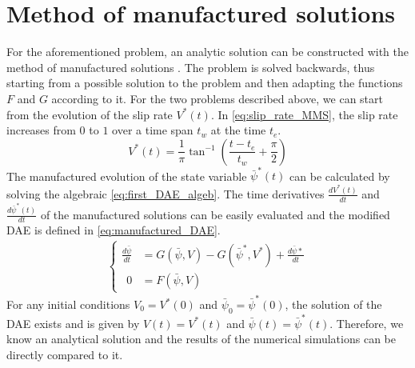 \section{Method of manufactured solutions}
For the aforementioned problem, an analytic solution can be constructed with the method of manufactured solutions \cite{ManufacturedSolution}. The problem is solved backwards, thus starting from a possible solution to the problem and then adapting the functions $F$ and $G$ according to it. For the two problems described above, we can start from the evolution of the slip rate $V^*(t)$. In \autoref{eq:slip_rate_MMS}, the slip rate increases from $0$ to $1$ over a time span $t_w$ at the time $t_e$.
\begin{equation}  
    \label{eq:slip_rate_MMS}
    V^*(t) = \frac{1}{\pi}\tan^{-1}\left(\frac{t-t_e}{t_w} + \frac{\pi}{2}\right)
\end{equation}
The manufactured evolution of the state variable $\bar{\psi}^*(t)$ can be calculated by solving the algebraic \autoref{eq:first_DAE_algeb}. The time derivatives $\frac{dV^*(t)}{dt}$ and $\frac{d\bar{\psi}^*(t)}{dt}$ of the manufactured solutions can be easily evaluated and the modified DAE is defined in \autoref{eq:manufactured_DAE}.
\begin{align}
    \label{eq:manufactured_DAE}
    \begin{cases}
	    \frac{d\bar{\psi}}{dt} &= G(\bar{\psi},V) - G(\bar{\psi}^*,V^*) + \frac{d\bar{\psi}*}{dt} \\
		\ \ 0 &= F(\bar{\psi}, V) 
	\end{cases}
\end{align}
For any initial conditions $V_0 = V^*(0)$ and $\bar{\psi}_0 = \bar{\psi}^*(0)$, the solution of the DAE exists and is given by $V(t) = V^*(t)$ and $\bar{\psi}(t) = \bar{\psi}^*(t)$. Therefore, we know an analytical solution and the results of the numerical simulations can be directly compared to it. 

